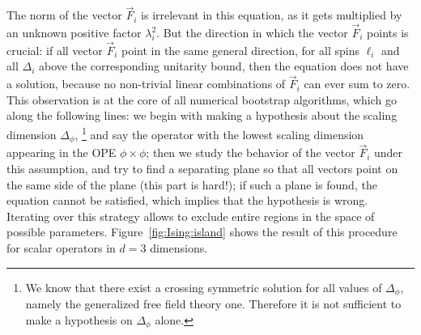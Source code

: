 \documentclass[a4paper,12pt]{article}
\numberwithin{equation}{section}
\begin{document}
%
The norm of the vector $\vec{F}_i$ is irrelevant in this equation, as it gets multiplied by an unknown positive factor $\lambda_i^2$. But the direction in which the vector $\vec{F}_i$ points is crucial: if all vector $\vec{F}_i$ point in the same general direction, for all spins $\ell_i$ and all $\Delta_i$ above the corresponding unitarity bound, then the equation does not have a solution, because no non-trivial linear combinations of $\vec{F}_i$ can ever sum to zero.
This observation is at the core of all numerical bootstrap algorithms, which go along the following lines:
we begin with making a hypothesis about the scaling dimension $\Delta_\phi$,%
%
\footnote{We know that there exist a crossing symmetric solution for all values of $\Delta_\phi$, namely the generalized free field theory one. Therefore it is not sufficient to make a hypothesis on $\Delta_\phi$ alone.} 
%
and say the operator with the lowest scaling dimension appearing in the OPE $\phi \times \phi$; then we study the behavior of the vector $\vec{F}_i$ under this assumption, and try to find a separating plane so that all vectors point on the same side of the plane
(this part is hard!); if such a plane is found, the equation cannot be satisfied, which implies that the hypothesis is wrong.
Iterating over this strategy allows to exclude entire regions in the space of possible parameters. Figure~\ref{fig:Ising:island} shows the result of this procedure for scalar operators in $d = 3$ dimensions. 
\end{document}
